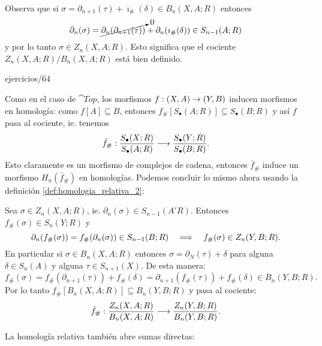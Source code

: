 \documentclass[../../topologia_algebraica]{subfiles}
\begin{document}
Observa que si $\sigma=\partial_{n+1}(\tau)+\imath_{\#}(\delta)\in B_n(X,A;R)$ entonces
\[
  \partial_n(\sigma)=
  \cancelto{0}{\partial_n(\partial_{n+1}(\tau))}+\partial_n(\imath_{\#}(\delta))\in S_{n-1}(A;R)
\]
y por lo tanto $\sigma\in Z_n(X,A;R)$. Esto significa que el cociente $Z_n(X,A;R)/B_n(X,A;R)$
est\'a bien definido.

{ejercicios/64} %

Como en el caso de $\cat{Top}$, los morfismos $f:(X,A)\rightarrow(Y,B)$ inducen morfismos en
homolog\'ia: como $f[A]\subseteq B$, entonces $f_{\#}[S_{\bullet}(A;R)]\subseteq S_{\bullet}(B;R)$
y as\'i $f$ pasa al cociente, ie. tenemos
\[
  \bar{f}_{\#}:\frac{S_{\bullet}(X;R)}{S_{\bullet}(A;R)} \longrightarrow \frac{S_{\bullet}(Y;R)}{S_{\bullet}(B;R)}.
\]
Esto claramente es un morfismo de complejos de cadena, entonces $\bar{f}_{\#}$ induce un
morfismo $H_n(\bar{f}_{\#})$ en homolog\'ias. Podemos concluir lo mismo ahora usando la
definici\'on \ref{def:homologia_relativa_2}:

Sea $\sigma\in Z_n(X,A;R)$, ie. $\partial_n(\sigma)\in S_{n-1}(A'R)$. Entonces
$f_{\#}(\sigma)\in S_n(Y;R)$ y
\[
  \partial_n(f_{\#}(\sigma))=f_{\#}(\partial_n(\sigma))\in S_{n-1}(B;R) \quad\Longrightarrow\quad
  f_{\#}(\sigma)\in Z_n(Y,B;R).
\]
En particular si $\sigma\in B_n(X,A;R)$ entonces $\sigma=\partial_N(\tau)+\delta$ para alguna
$\delta\in S_n(A)$ y alguna $\tau\in S_{n+1}(X)$. De esta manera:
\[
  f_{\#}(\sigma)=f_{\#}(\partial_{n+1}(\tau))+f_{\#}(\delta)=
  \partial_{n+1}(f_{\#}(\tau))+f_{\#}(\delta)\in B_n(Y,B;R).
\]
Por lo tanto $f_{\#}[B_n(X,A;R)]\subseteq B_n(Y,B;R)$ y pasa al cociente:
\[
	\bar{f}_{\#}:\frac{Z_n(X,A;R)}{B_n(X,A;R)} \longrightarrow \frac{Z_n(Y,B;R)}{B_n(Y,B;R)}.
\]

La homolog\'ia relativa tambi\'en abre sumas directas:
\end{document}

